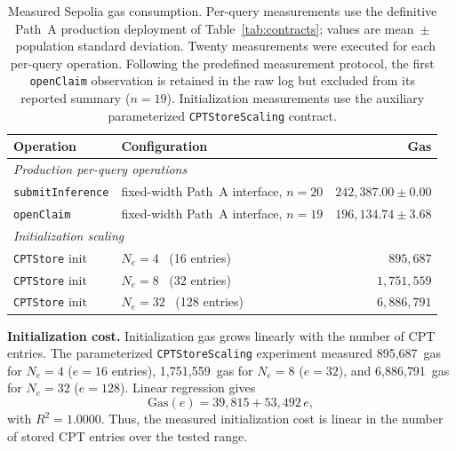 \documentclass[journal]{IEEEtran}
\theoremstyle{definition}
\theoremstyle{remark}
\begin{document}
\begin{table}[t]
\centering
\caption{Measured Sepolia gas consumption.
Per-query measurements use the definitive Path~A production
deployment of Table~\ref{tab:contracts}; values are
mean~$\pm$~population standard deviation.
Twenty measurements were executed for each per-query
operation. Following the predefined measurement protocol,
the first \texttt{openClaim} observation is retained in the
raw log but excluded from its reported summary
($n=19$). Initialization measurements use the auxiliary
parameterized \texttt{CPTStoreScaling} contract.}
\label{tab:gas-scaling}
\begin{tabularx}{\columnwidth}{lXr}
\toprule
\textbf{Operation} &
\textbf{Configuration} &
\textbf{Gas} \\
\midrule
\multicolumn{3}{l}{\emph{Production per-query operations}} \\

\texttt{submitInference}
& fixed-width Path~A interface, $n{=}20$
& $242{,}387.00 \pm 0.00$ \\

\texttt{openClaim}
& fixed-width Path~A interface, $n{=}19$
& $196{,}134.74 \pm 3.68$ \\

\midrule
\multicolumn{3}{l}{\emph{Initialization scaling}} \\

\texttt{CPTStore} init
& $N_e{=}4$ \ (16 entries)
& $895{,}687$ \\

\texttt{CPTStore} init
& $N_e{=}8$ \ (32 entries)
& $1{,}751{,}559$ \\

\texttt{CPTStore} init
& $N_e{=}32$ \ (128 entries)
& $6{,}886{,}791$ \\

\bottomrule
\end{tabularx}
\end{table}

\noindent\textbf{Initialization cost.}
Initialization gas grows linearly with the number of CPT
entries. The parameterized \texttt{CPTStoreScaling}
experiment measured 895{,}687~gas for $N_e=4$
($e=16$ entries), 1{,}751{,}559~gas for $N_e=8$
($e=32$), and 6{,}886{,}791~gas for $N_e=32$
($e=128$). Linear regression gives
\[
  \mathrm{Gas}(e)
  = 39{,}815 + 53{,}492\,e,
\]
with $R^2=1.0000$. Thus, the measured initialization
cost is linear in the number of stored CPT entries over
the tested range.
\end{document}
